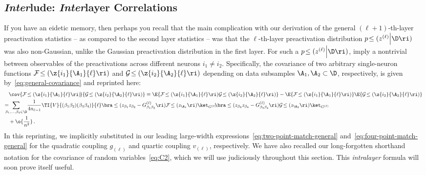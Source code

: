 \setcounter{subsection}{-1}
\subsection{\emph{Inter}lude: \emph{Inter}layer Correlations}\label{subsec:interlayer-interlude}
If you have an eidetic memory, then perhaps you recall that the main complication with our derivation of the general $(\ell+1)$-th-layer preactivation statistics -- as compared to the second layer statistics -- was that the $\ell$-th-layer preactivation distribution $p\!\le(z^{(\ell)}\Big\vert\D\ri)$ was also non-Gaussian, unlike the Gaussian preactivation distribution in the first layer.
For such a  $p\!\le(z^{(\ell)}\Big\vert\D\ri)$,  imply a nontrivial  between observables of the preactivations across different neurons $i_1\ne i_2$. Specifically, the covariance of two arbitrary single-neuron functions $\mathcal{F}\!\le(\z{i_1}{\A_1}{\ell}\ri)$ and $\mathcal{G}\!\le(\z{i_2}{\A_2}{\ell}\ri)$ depending on data subsamples $\A_1, \A_2\subset\D$, respectively, is given by~\eqref{eq:general-covariance} and reprinted here:
\begin{align}\label{eq:general-covariance-reprint}
&\cov{\mathcal{F}\!\le(\z{i_1}{\A_1}{\ell}\ri)\!}{\mathcal{G}\!\le(\z{i_2}{\A_2}{\ell}\ri)} \equiv \E{\mathcal{F}\!\le(\z{i_1}{\A_1}{\ell}\ri)\mathcal{G}\!\le(\z{i_2}{\A_2}{\ell}\ri)}-\E{\mathcal{F}\!\le(\z{i_1}{\A_1}{\ell}\ri)}\E{\mathcal{G}\!\le(\z{i_2}{\A_2}{\ell}\ri)}\, \notag \\
=&\!\!\!\!\!\sum_{\beta_1,\ldots,\beta_4\in\D}\!\frac{1}{4n_{\ell-1}}\TI{V}{(\beta_1\beta_2)(\beta_3\beta_4)}{\ell}\bra \le(z_{\beta_1} z_{\beta_2}-G^{(\ell)}_{\beta_1\beta_2}\ri) \mathcal{F}\!\le(z_{\A_1}\ri) \ket_{G^{(\ell)}}\!\!\bra  \le(z_{\beta_3} z_{\beta_4}-G^{(\ell)}_{\beta_3\beta_4}\ri)\mathcal{G}\!\le(z_{\A_2}\ri) \ket_{G^{(\ell)}}\, \notag\\
&+\o{\frac{1}{n^2}}\,  .
\end{align}
In this reprinting, we implicitly substituted in our leading large-width expressions~\eqref{eq:two-point-match-general} and~\eqref{eq:four-point-match-general} for the quadratic coupling $g_{(\ell)}$ and quartic coupling $v_{(\ell)}$, respectively.
We have also recalled our long-forgotten shorthand notation for the covariance of random variables~\eqref{eq:C2}, which we will use judiciously throughout this section.
This \emph{intralayer} formula will soon prove itself useful.


